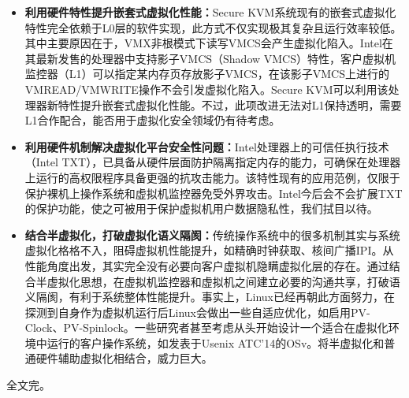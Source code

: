 \begin{itemize}
\item \textbf{利用硬件特性提升嵌套式虚拟化性能：}Secure KVM系统现有的嵌套式虚拟化特性完全依赖于L0层的软件实现，此方式不仅实现极其复杂且运行效率较低。其中主要原因在于，VMX非根模式下读写VMCS会产生虚拟化陷入。Intel在其最新发售的处理器中支持影子VMCS（Shadow VMCS）特性，客户虚拟机监控器（L1）可以指定某内存页存放影子VMCS，在该影子VMCS上进行的VMREAD/VMWRITE操作不会引发虚拟化陷入。Secure KVM可以利用该处理器新特性提升嵌套式虚拟化性能。不过，此项改进无法对L1保持透明，需要L1合作配合，能否用于虚拟化安全领域仍有待考虑。
\item \textbf{利用硬件机制解决虚拟化平台安全性问题：}Intel处理器上的可信任执行技术（Intel TXT），已具备从硬件层面防护隔离指定内存的能力，可确保在处理器上运行的高权限程序具备更强的抗攻击能力。该特性现有的应用范例，仅限于保护裸机上操作系统和虚拟机监控器免受外界攻击。Intel今后会不会扩展TXT的保护功能，使之可被用于保护虚拟机用户数据隐私性，我们拭目以待。
\item \textbf{结合半虚拟化，打破虚拟化语义隔阂：}传统操作系统中的很多机制其实与系统虚拟化格格不入，阻碍虚拟机性能提升，如精确时钟获取、核间广播IPI。从性能角度出发，其实完全没有必要向客户虚拟机隐瞒虚拟化层的存在。通过结合半虚拟化思想，在虚拟机监控器和虚拟机之间建立必要的沟通共享，打破语义隔阂，有利于系统整体性能提升。事实上，Linux已经再朝此方面努力，在探测到自身作为虚拟机运行后Linux会做出一些自适应优化，如启用PV-Clock、PV-Spinlock。一些研究者甚至考虑从头开始设计一个适合在虚拟化环境中运行的客户操作系统，如发表于Usenix ATC'14的OSv\cite{osv}。将半虚拟化和普通硬件辅助虚拟化相结合，威力巨大。
\end{itemize}

全文完。




